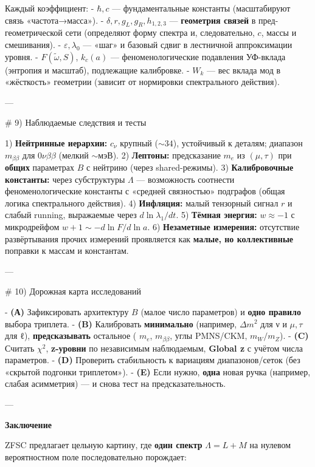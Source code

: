 \documentclass[12pt,a4paper]{article}
\begin{document}
Каждый коэффициент:
- \(\hbar,c\) — фундаментальные константы (масштабируют связь «частота→масса»).  
- \(\delta,r,g_L,g_R,h_{1,2,3}\) — \textbf{геометрия связей} в пред-геометрической сети (определяют форму спектра и, следовательно, \(c\), массы и смешивания).  
- \(\varepsilon,\lambda_0\) — «шаг» и базовый сдвиг в лестничной аппроксимации уровня.  
- \(F(\tilde\omega,S)\), \(k_c(a)\) — феноменологические подавления УФ-вклада (энтропия и масштаб), подлежащие калибровке.  
- \(W_k\) — вес вклада мод в «жёсткость» геометрии (зависит от нормировки спектрального действия).

---

\# 9) Наблюдаемые следствия и тесты

1) \textbf{Нейтринные иерархии:} \(c_\nu\) крупный (\(\sim 34\)), устойчивый к деталям; диапазон \(m_{\beta\beta}\) для \(0\nu\beta\beta\) (мелкий \(\sim\)мэВ).  
2) \textbf{Лептоны:} предсказание \(m_e\) из \((\mu,\tau)\) при \textbf{общих} параметрах \(B\) с нейтрино (через shared-режимы).  
3) \textbf{Калибровочные константы:} через субструктуры \(\Lambda\) — возможность соотнести феноменологические константы с «средней связностью» подграфов (общая логика спектрального действия).  
4) \textbf{Инфляция:} малый тензорный сигнал \(r\) и слабый running, выражаемые через \(d\ln\lambda_1/dt\).  
5) \textbf{Тёмная энергия:} \(w\approx -1\) с микродрейфом \(w+1\sim -d\ln F/d\ln a\).  
6) \textbf{Незаметные измерения:} отсутствие развёртывания прочих измерений проявляется как \textbf{малые, но коллективные} поправки к массам и константам.

---

\# 10) Дорожная карта исследований

- \textbf{(А)} Зафиксировать архитектуру \(B\) (малое число параметров) и \textbf{одно правило} выбора триплета.  
- \textbf{(B)} Калибровать \textbf{минимально} (например, \(\Delta m^2\) для ν и \(\mu,\tau\) для ℓ), \textbf{предсказывать} остальное ( \(m_e\), \(m_{\beta\beta}\), углы PMNS/CKM, \(m_W/m_Z\)).  
- \textbf{(C)} Считать \(\chi^2\), \textbf{z-уровни} по независимым наблюдаемым, \textbf{Global z} с учётом числа параметров.  
- \textbf{(D)} Проверить стабильность к вариациям диапазонов/сеток (без «скрытой подгонки триплетом»).  
- \textbf{(E)} Если нужно, \textbf{одна} новая ручка (например, слабая асимметрия) — и снова тест на предсказательность.

---

\textbf{Заключение}

ZFSC предлагает цельную картину, где \textbf{один спектр} \(\Lambda=L+M\) на нулевом вероятностном поле последовательно порождает:
\end{document}
